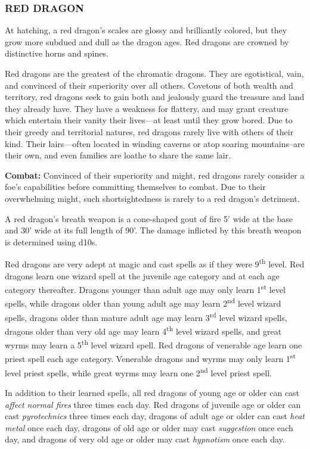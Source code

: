 \begin{multicols}{2}
\subsubsection{RED DRAGON}

At hatching, a red dragon's scales are glossy and brilliantly colored, but they grow more subdued and dull as the dragon ages. Red dragons are crowned by distinctive horns and spines.

Red dragons are the greatest of the chromatic dragons. They are egotistical, vain, and convinced of their superiority over all others. Covetous of both wealth and territory, red dragons seek to gain both and jealously guard the treasure and land they already have. They have a weakness for flattery, and may grant creature which entertain their vanity their lives---at least until they grow bored. Due to their greedy and territorial natures, red dragons rarely live with others of their kind. Their lairs---often located in winding caverns or atop soaring mountains--are their own, and even families are loathe to share the same lair.

\textbf{Combat:} Convinced of their superiority and might, red dragons rarely consider a foe's capabilities before committing themselves to combat. Due to their overwhelming might, such shortsightedness is rarely to a red dragon's detriment.

A red dragon's breath weapon is a cone-shaped gout of fire 5' wide at the base and 30' wide at its full length of 90'. The damage inflicted by this breath weapon is determined using d10s. 

Red dragons are very adept at magic and cast spells as if they were 9\textsuperscript{th} level. Red dragons learn one wizard spell at the juvenile age category and at each age category thereafter. Dragons younger than adult age may only learn 1\textsuperscript{st} level spells, while dragons older than young adult age may learn 2\textsuperscript{nd} level wizard spells, dragons older than mature adult age may learn 3\textsuperscript{rd} level wizard spells, dragons older than very old age may learn 4\textsuperscript{th} level wizard spells, and great wyrms may learn a 5\textsuperscript{th} level wizard spell. Red dragons of venerable age learn one priest spell each age category. Venerable dragons and wyrms may only learn 1\textsuperscript{st} level priest spells, while great wyrms may learn one 2\textsuperscript{nd} level priest spell.

In addition to their learned spells, all red dragons of young age or older can cast \textit{affect normal fires} three times each day. Red dragons of juvenile age or older can cast \textit{pyrotechnics} three times each day, dragons of adult age or older can cast \textit{heat metal} once each day, dragons of old age or older may cast \textit{suggestion} once each day, and dragons of very old age or older may cast \textit{hypnotism} once each day.


\end{multicols}
